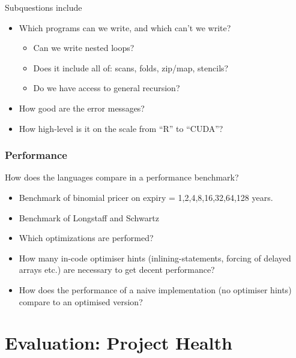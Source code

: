 Subquestions include
\begin{itemize}
\item Which programs can we write, and which can't we write?
  \begin{itemize}
  \item Can we write nested loops?
  \item Does it include all of: scans, folds, zip/map, stencils?
  \item Do we have access to general recursion?
  \end{itemize}
\item How good are the error messages?
\item How high-level is it on the scale from ``R'' to ``CUDA''?
\end{itemize}

\subsection{Performance} How does the languages compare in a
performance benchmark?
\begin{itemize}
\item Benchmark of binomial pricer on expiry = 1,2,4,8,16,32,64,128 years.
\item Benchmark of Longstaff and Schwartz
\item Which optimizations are performed?
\item How many in-code optimiser hints (inlining-statements, forcing
  of delayed arrays etc.) are necessary to get decent performance?
\item How does the performance of a naive implementation (no
  optimiser hints) compare to an optimised version?
\end{itemize}



\chapter{Evaluation: Project Health}

